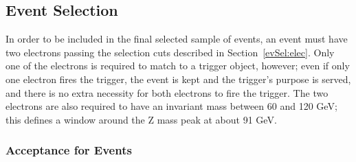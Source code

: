





\subsection{\Zee Event Selection}
\label{evSel:zee}

In order to be included in the final selected sample of \Zee events, 
an event must have two electrons passing the selection cuts 
described in Section~\ref{evSel:elec}.  
Only one of the electrons is required to match to a trigger object, however; 
even if only one electron fires the trigger, 
the event is kept and the trigger's purpose is served, 
and there is no extra necessity for both electrons to fire the trigger.  
The two electrons are also required to have an invariant mass 
between 60 and 120 GeV; 
this defines a window around the Z mass peak at about 91 GeV.  

\subsubsection{Acceptance for \Zee Events}  %
\label{evSel:acc}

